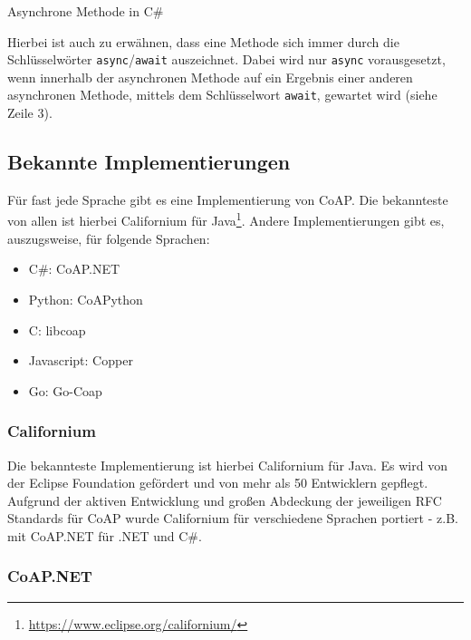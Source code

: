 \begin{listing}[H]
    \inputminted[framesep=2mm, baselinestretch=1.2, fontsize=\normalsize, linenos]{csharp}{codes/example_asynchronous.cs}
    \caption{Asynchrone Methode in C\#}
    \label{listing:asynchrone-methode-in-csharp}
\end{listing}

Hierbei ist auch zu erwähnen, dass eine Methode sich immer durch die Schlüsselwörter \texttt{async}/\texttt{await} auszeichnet. Dabei wird nur \texttt{async} vorausgesetzt, wenn innerhalb der asynchronen Methode auf ein Ergebnis einer anderen asynchronen Methode, mittels dem Schlüsselwort \texttt{await}, gewartet wird (siehe Zeile 3).

\subsection{Bekannte Implementierungen}
\label{subsec:bekannte-implementierungen}

Für fast jede Sprache gibt es eine Implementierung von CoAP. Die bekannteste von allen ist hierbei Californium für Java\footnote{\href{https://www.eclipse.org/californium/}{https://www.eclipse.org/californium/}}. Andere Implementierungen gibt es, auszugsweise, für folgende Sprachen:
\begin{itemize}
    \item C\#: CoAP.NET
    \item Python: CoAPython
    \item C: libcoap
    \item Javascript: Copper
    \item Go: Go-Coap
\end{itemize}

\subsubsection{Californium}
\label{subsubsec:californium}

Die bekannteste Implementierung ist hierbei Californium für Java. Es wird von der Eclipse Foundation gefördert und von mehr als 50 Entwicklern gepflegt. Aufgrund der aktiven Entwicklung und großen Abdeckung der jeweiligen RFC Standards für CoAP wurde Californium für verschiedene Sprachen portiert - z.B. mit CoAP.NET für .NET und C\#.

\subsubsection{CoAP.NET}
\label{subsubsec:coap-net}

